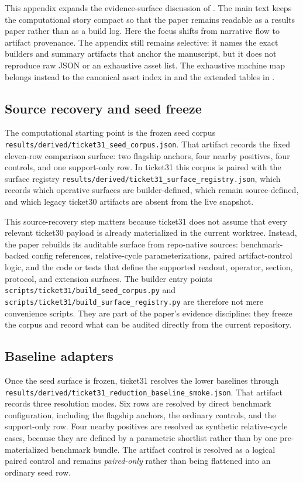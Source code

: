\documentclass[11pt]{article}
\theoremstyle{definition}
\begin{document}
This appendix expands the evidence-surface discussion of
. The main text keeps the computational story compact so
that the paper remains readable as a results paper rather than as a build log. Here the
focus shifts from narrative flow to artifact provenance. The appendix still remains
selective: it names the exact builders and summary artifacts that anchor the manuscript,
but it does not reproduce raw JSON or an exhaustive asset list. The exhaustive machine map
belongs instead to the canonical asset index in 
and the extended tables in .

\subsection{Source recovery and seed freeze}

The computational starting point is the frozen seed corpus
\nolinkurl{results/derived/ticket31_seed_corpus.json}. That artifact records the fixed
eleven-row comparison surface: two flagship anchors, four nearby positives, four controls,
and one support-only row. In ticket31 this corpus is paired with the surface registry
\nolinkurl{results/derived/ticket31_surface_registry.json}, which records which operative
surfaces are builder-defined, which remain source-defined, and which legacy ticket30
artifacts are absent from the live snapshot.

This source-recovery step matters because ticket31 does not assume that every relevant
ticket30 payload is already materialized in the current worktree. Instead, the paper
rebuilds its auditable surface from repo-native sources: benchmark-backed config
references, relative-cycle parameterizations, paired artifact-control logic, and the code
or tests that define the supported readout, operator, section, protocol, and extension
surfaces. The builder entry points
\nolinkurl{scripts/ticket31/build_seed_corpus.py} and
\nolinkurl{scripts/ticket31/build_surface_registry.py} are therefore not mere convenience
scripts. They are part of the paper's evidence discipline: they freeze the corpus and
record what can be audited directly from the current repository.

\subsection{Baseline adapters}

Once the seed surface is frozen, ticket31 resolves the lower baselines through
\nolinkurl{results/derived/ticket31_reduction_baseline_smoke.json}. That artifact records
three resolution modes. Six rows are resolved by direct benchmark configuration, including
the flagship anchors, the ordinary controls, and the support-only row. Four nearby
positives are resolved as synthetic relative-cycle cases, because they are defined by a
parametric shortlist rather than by one pre-materialized benchmark bundle. The artifact
control is resolved as a logical paired control and remains \emph{paired-only} rather than
being flattened into an ordinary seed row.
\end{document}
